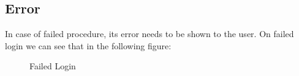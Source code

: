 \subsection{Error}
In case of failed procedure, its error needs to be shown to the user. On failed login we can see that in the following figure:
\begin{figure}[H]
	\centering
	\caption{Failed Login}
\end{figure}
